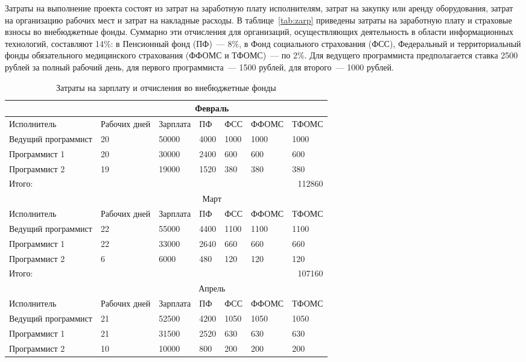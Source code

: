 Затраты на выполнение проекта состоят из затрат на заработную плату исполнителям, затрат на закупку или аренду оборудования, затрат на организацию рабочих мест и затрат на накладные расходы. В таблице~\ref{tab:zarp} приведены затраты на заработную плату и страховые взносы во внебюджетные фонды. Суммарно эти отчисления для организаций, осуществляющих деятельность в области информационных технологий, составляют 14\%: в Пенсионный фонд (ПФ)~--- 8\%, в Фонд социального страхования (ФСС), Федеральный и территориальный фонды обязательного медицинского страхования (ФФОМС и ТФОМС)~--- по 2\%. Для ведущего программиста предполагается ставка 2500 рублей за полный рабочий день, для первого программиста~--- 1500 рублей, для второго~--- 1000 рублей. 

\begin{table}[ht!]\footnotesize
\caption{Затраты на зарплату и отчисления во внебюджетные фонды}
\begin{tabular}{|l|l|l|l|l|l|l|}
\hline
& \multicolumn{6}{c|}{Февраль}\\
\hline
Исполнитель & Рабочих дней & Зарплата & ПФ & ФСС & ФФОМС & ТФОМС\\
\hline
Ведущий программист & 20 & 50000 & 4000 & 1000 & 1000 & 1000\\
\hline
Программист 1 & 20 & 30000 & 2400 & 600 & 600 & 600\\
\hline
Программист 2 & 19 & 19000 & 1520 & 380 & 380 & 380\\
\hline
Итого: & \multicolumn{6}{r|}{112860}\\
\hline
& \multicolumn{6}{c|}{Март}\\
\hline
Исполнитель & Рабочих дней & Зарплата & ПФ & ФСС & ФФОМС & ТФОМС\\
\hline
Ведущий программист & 22 & 55000 & 4400 & 1100 & 1100 & 1100\\
\hline
Программист 1 & 22 & 33000 & 2640 & 660 & 660 & 660\\
\hline
Программист 2 & 6 & 6000 & 480 & 120 & 120 & 120\\
\hline
Итого: & \multicolumn{6}{r|}{107160}\\
\hline
& \multicolumn{6}{c|}{Апрель}\\
\hline
Исполнитель & Рабочих дней & Зарплата & ПФ & ФСС & ФФОМС & ТФОМС\\
\hline
Ведущий программист & 21 & 52500 & 4200 & 1050 & 1050 & 1050\\
\hline
Программист 1 & 21 & 31500 & 2520 & 630 & 630 & 630\\
\hline
Программист 2 & 10 & 10000 & 800 & 200 & 200 & 200\\

\end{tabular}
\end{table}
